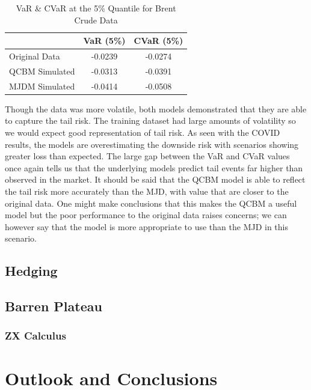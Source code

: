 \documentclass[12pt]{article}
\numberwithin{equation}{section}
\begin{document}
\begin{table}[h!]
\centering
\begin{tabular}{lcc}
\hline
\textbf{} & \textbf{VaR (5\%)} & \textbf{CVaR (5\%)} \\
\hline
Original Data     & -0.0239 & -0.0274 \\
QCBM Simulated    & -0.0313 & -0.0391 \\
MJDM Simulated    & -0.0414 & -0.0508 \\
\hline
\end{tabular}
\caption{VaR \& CVaR at the 5\% Quantile for Brent Crude Data}
\label{tab:cvar_5_brent}
\end{table}
Though the data was more volatile, both models demonstrated that they 
are able to capture the tail risk. The training dataset had large amounts of 
volatility so we would expect good representation of tail risk. 
As seen with the COVID results, 
the models are overestimating the downside risk with scenarios showing 
greater loss than expected. The large gap between the VaR and CVaR values once 
again tells us that the underlying models predict tail events far higher than 
observed in the market. It should be said that the QCBM model is able to reflect 
the tail risk more accurately than the MJD, with value that are closer to the 
original data. One might make conclusions that this makes the QCBM a useful model 
but the poor performance to the original data raises concerns; we can however 
say that the model is more appropriate to use than the MJD in this scenario. 



\newpage
\subsection{Hedging}

\subsection{Barren Plateau}

\subsubsection{ZX Calculus}

\clearpage 

\section{Outlook and Conclusions}
\end{document}
